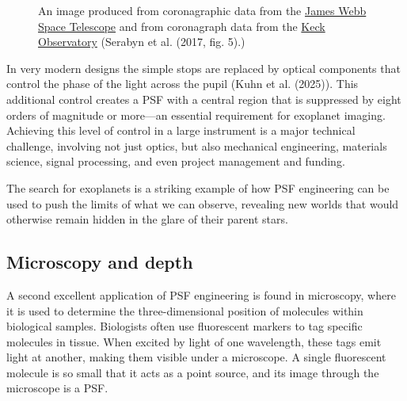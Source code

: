 \documentclass[
  letterpaper,
]{book}
\begin{document}
\begin{figure}


\caption{\label{fig-psfengineering-kuhn}An image produced from
coronagraphic data from the \href{https://tinyurl.com/mr2b67ce}{James
Webb Space Telescope} and from coronagraph data from the
\href{https://www.caltech.edu/about/news/keck-observatorys-new-planet-imager-delivers-first-science-53770}{Keck
Observatory} (Serabyn et al. (2017, fig. 5).)}

\end{figure}%

In very modern designs the simple stops are replaced by optical
components that control the phase of the light across the pupil (Kuhn et
al. (2025)). This additional control creates a PSF with a central region
that is suppressed by eight orders of magnitude or more---an essential
requirement for exoplanet imaging. Achieving this level of control in a
large instrument is a major technical challenge, involving not just
optics, but also mechanical engineering, materials science, signal
processing, and even project management and funding.

The search for exoplanets is a striking example of how PSF engineering
can be used to push the limits of what we can observe, revealing new
worlds that would otherwise remain hidden in the glare of their parent
stars.

\subsection{Microscopy and depth}\label{sec-psf-depth}

A second excellent application of PSF engineering is found in
microscopy, where it is used to determine the three-dimensional position
of molecules within biological samples. Biologists often use fluorescent
markers to tag specific molecules in tissue. When excited by light of
one wavelength, these tags emit light at another, making them visible
under a microscope. A single fluorescent molecule is so small that it
acts as a point source, and its image through the microscope is a PSF.
\end{document}
